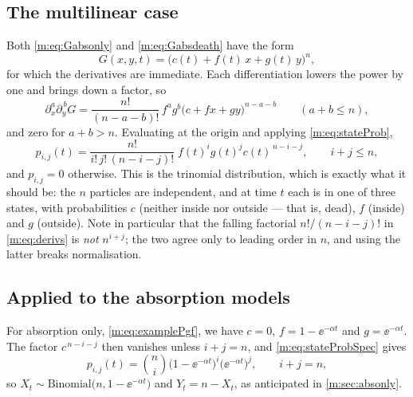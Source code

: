 \subsection*{The multilinear case}

Both \cref{m:eq:Gabsonly} and \cref{m:eq:Gabsdeath} have the form
\begin{equation}
\label{m:eq:multilinear}
G(x,y,t) = \bigl(c(t) + f(t)\,x + g(t)\,y\bigr)^n ,
\end{equation}
for which the derivatives are immediate. Each differentiation lowers the power by
one and brings down a factor, so
\begin{equation}
\label{m:eq:derivs}
\partial_x^{a}\partial_y^{\,b}G
= \frac{n!}{(n-a-b)!}\,f^{a}g^{b}\bigl(c+fx+gy\bigr)^{n-a-b}
\qquad(a+b\le n),
\end{equation}
and zero for $a+b>n$. Evaluating at the origin and applying \cref{m:eq:stateProb},
\begin{equation}
\label{m:eq:stateProbSpec}
p_{i,j}(t) = \frac{n!}{i!\,j!\,(n-i-j)!}\;f(t)^{i}g(t)^{j}c(t)^{\,n-i-j},
\qquad i+j\le n,
\end{equation}
and $p_{i,j}=0$ otherwise. This is the trinomial distribution, which is exactly
what it should be: the $n$ particles are independent, and at time $t$ each is in
one of three states, with probabilities $c$ (neither inside nor outside --- that
is, dead), $f$ (inside) and $g$ (outside). Note in particular that the falling
factorial $n!/(n-i-j)!$ in \cref{m:eq:derivs} is \emph{not} $n^{i+j}$; the two agree
only to leading order in $n$, and using the latter breaks normalisation.

\subsection*{Applied to the absorption models}

For absorption only, \cref{m:eq:examplePgf}, we have $c=0$, $f = 1-\ee^{-\alpha t}$
and $g = \ee^{-\alpha t}$. The factor $c^{\,n-i-j}$ then vanishes unless $i+j=n$,
and \cref{m:eq:stateProbSpec} gives
\begin{equation*}
p_{i,j}(t) = \binom{n}{i}\bigl(1-\ee^{-\alpha t}\bigr)^{i}\bigl(\ee^{-\alpha t}\bigr)^{j},
\qquad i+j=n,
\end{equation*}
so $X_t\sim\text{Binomial}\bigl(n,1-\ee^{-\alpha t}\bigr)$ and $Y_t = n-X_t$, as
anticipated in \cref{m:sec:absonly}.

